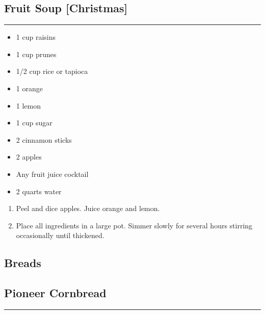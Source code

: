 \documentclass{article}
\begin{document}
\subsection{Fruit Soup [Christmas]} 
\noindent\rule[0.5ex]{\linewidth}{1pt}

\begin{framed}
    \begin{itemize}
        \item 1 cup raisins 
        \item 1 cup prunes 
        \item 1/2 cup rice or tapioca 
        \item 1 orange 
        \item 1 lemon 
        \item 1 cup sugar 
        \item 2 cinnamon sticks 
        \item 2 apples
        \item Any fruit juice cocktail 
        \item 2 quarts water 
    \end{itemize}
\end{framed}

\begin{enumerate}
    \item 
        Peel and dice apples. Juice orange and lemon.
    \item 
        Place all ingredients in a large pot. Simmer slowly for several hours stirring occasionally until thickened.
\end{enumerate}
\newpage

\vspace*{\fill}
\begin{center}
    \section{Breads}
\end{center}
\vspace*{\fill}
\newpage

\subsection{Pioneer Cornbread} 
\noindent\rule[0.5ex]{\linewidth}{1pt}
\end{document}
